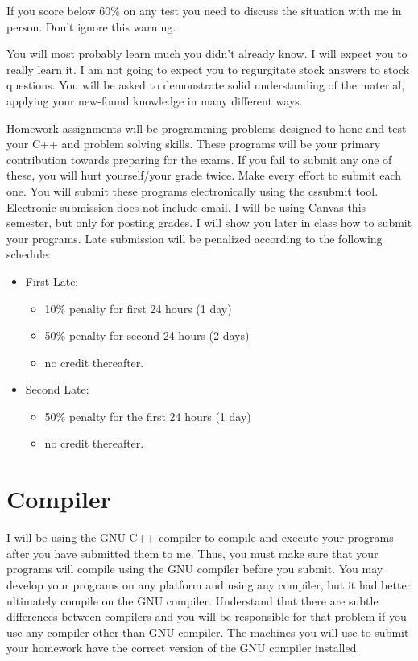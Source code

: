 \documentclass{article}
\begin{document}
If you score below 60\% on any test you need to discuss the situation with me in person. Don’t ignore this warning.

You will most probably learn much you didn't already know.
I will expect you to really learn it.
I am not going to expect you to regurgitate stock answers to stock questions.
You will be asked to demonstrate solid understanding of the material, applying your new-found knowledge in many different ways.

Homework assignments will be programming problems designed to hone and test your C++ and problem solving skills.
These programs will be your primary contribution towards preparing for the exams.
If you fail to submit any one of these, you will hurt yourself/your grade twice.
Make every effort to submit each one.
You will submit these programs electronically using the cssubmit tool.
Electronic submission does not include email.
I will be using Canvas this semester, but only for posting grades.
I will show you later in class how to submit your programs.
Late submission will be penalized according to the following schedule:

\begin{itemize}
	\item First Late:
		\begin{itemize}
			\item 10\% penalty for first 24 hours (1 day)
			\item 50\% penalty for second 24 hours (2 days)
			\item no credit thereafter.
		\end{itemize}
	\item Second Late:
		\begin{itemize}
			\item 50\% penalty for the first 24 hours (1 day)
			\item no credit thereafter.
		\end{itemize}
\end{itemize}

\section{Compiler}
I will be using the GNU C++ compiler to compile and execute your programs after you have submitted them to me.
Thus, you must make sure that your programs will compile using the GNU compiler before you submit.
You may develop your programs on any platform and using any compiler, but it had better ultimately compile on the GNU compiler.
Understand that there are subtle differences between compilers and you will be responsible for that problem if you use any compiler other than GNU compiler.
The machines you will use to submit your homework have the correct version of the GNU compiler installed.
\end{document}
